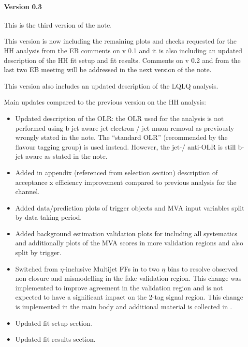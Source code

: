 \paragraph*{Version 0.3}

This is the third version of the note. 

This version is now including the remaining plots and checks requested for the HH analysis from the EB comments on v 0.1 and it is also including an updated description of the HH fit setup and fit results. Comments on v 0.2 and from the last two EB meeting will be addressed in the next version of the note.

This version also includes an updated description of the LQLQ analysis. 

Main updates compared to the previous version on the HH analysis:

\begin{itemize}
\item Updated description of the OLR: the OLR used for the analysis is not performed using
b-jet aware jet-electron / jet-muon removal as previously wrongly stated in the note. The ``standard OLR''
(recommended by the flavour tagging group) is used instead. However,
the jet-\tauhad / anti-\tauhad OLR is still b-jet aware as stated in
the note.
\item Added in appendix (referenced from selection section) description of acceptance x efficiency improvement compared to previous analysis for the \hadhad channel.
\item Added data/prediction plots of \hadhad trigger objects and MVA input variables split by data-taking period.
\item Added background estimation validation plots for \hadhad including all systematics and additionally plots of the MVA scores in more validation regions and also split by trigger.
\item Switched from $\eta$-inclusive Multijet FFs in \hadhad to two
  $\eta$ bins to resolve observed non-closure and mismodelling in the
  fake validation region. This change was implemented to improve
  agreement in the validation region and is not expected to have a
  significant impact on the 2-tag signal region. This change is
  implemented in the main body and additional material is collected in
  .
\item Updated fit setup section.
\item Updated fit results section.
\end{itemize}

